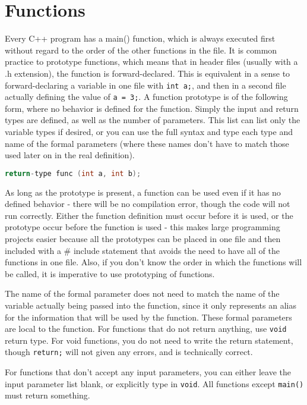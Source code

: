 \documentclass[10pt]{article}
\begin{document}
\section{Functions}

Every C++ program has a main() function, which is always executed first without regard to the order of the other functions in the file. It is common practice to prototype functions, which means that in header files (usually with a .h extension), the function is forward-declared. This is equivalent in a sense to forward-declaring a variable in one file with \texttt{int a;}, and then in a second file actually defining the value of \texttt{a = 3;}. A function prototype is of the following form, where no behavior is defined for the function. Simply the input and return types are defined, as well as the number of parameters. This list can list only the variable types if desired, or you can use the full syntax and type each type and name of the formal parameters (where these names don't have to match those used later on in the real definition).

\begin{lstlisting}[language=C++]
return-type func (int a, int b);
\end{lstlisting}

As long as the prototype is present, a function can be used even if it has no defined behavior - there will be no compilation error, though the code will not run correctly. Either the function definition must occur before it is used, or the prototype occur before the function is used - this makes large programming projects easier because all the prototypes can be placed in one file and then included with a \# include statement that avoids the need to have all of the functions in one file. Also, if you don't know the order in which the functions will be called, it is imperative to use prototyping of functions.

The name of the formal parameter does not need to match the name of the variable actually being passed into the function, since it only represents an alias for the information that will be used by the function. These formal parameters are local to the function. For functions that do not return anything, use \texttt{void} return type. For void functions, you do not need to write the return statement, though \texttt{return;} will not given any errors, and is technically correct. 

For functions that don't accept any input parameters, you can either leave the input parameter list blank, or explicitly type in \texttt{void}. All functions except \texttt{main()} must return something.
\end{document}
